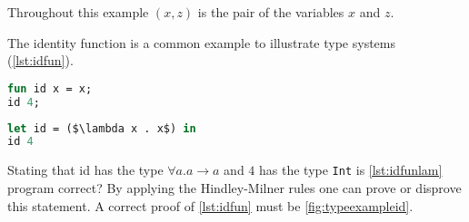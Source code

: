 \documentclass[11pt,oneside,a4paper]{report}
\begin{document}
\begin{exmp}
\label{exmp:letpoly}
Throughout this example $(x, z)$ is the pair of the variables $x$ and $z$.

The identity function is a common example to illustrate type systems (\autoref{lst:idfun}).
\begin{lstlisting}[language=ML,caption={Identity function in $L$},label={lst:idfun}]
fun id x = x;
id 4;
\end{lstlisting}
\begin{lstlisting}[language=ML,caption={Identity function in lambda calculus with let},label={lst:idfunlam},mathescape=true]
let id = ($\lambda x . x$) in
id 4
\end{lstlisting}
Stating that id has the type $\forall a.a \rightarrow a$ and $4$ has the type \texttt{Int} is \autoref{lst:idfunlam} program correct?
By applying the Hindley-Milner rules one can prove or disprove this statement.
A correct proof of \autoref{lst:idfun} must be \autoref{fig:typeexampleid}.


\end{exmp}
\end{document}
